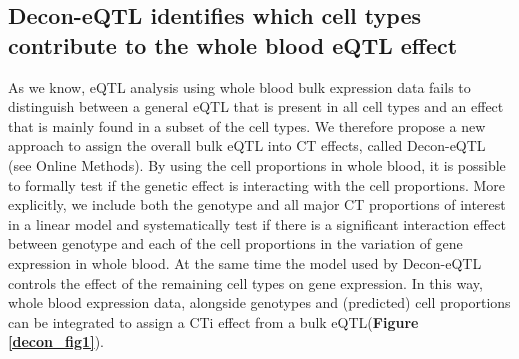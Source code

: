 \subsection{Decon-eQTL identifies which cell types contribute to the whole blood eQTL effect}
As we know, eQTL analysis using whole blood bulk expression data fails to distinguish between a general eQTL that is present in all cell types and an effect that is mainly found in a subset of the cell types. We therefore propose a new approach to assign the overall bulk eQTL into CT effects, called Decon-eQTL (see Online Methods). By using the cell proportions in whole blood, it is possible to formally test if the genetic effect is interacting with the cell proportions. More explicitly, we include both the genotype and all major CT proportions of interest in a linear model and systematically test if there is a significant interaction effect between genotype and each of the cell proportions in the variation of gene expression in whole blood. At the same time the model used by Decon-eQTL controls the effect of the remaining cell types on gene expression. In this way, whole blood expression data, alongside genotypes and (predicted) cell proportions can be integrated to assign a CTi effect from a bulk eQTL(\textbf{Figure \ref{decon_fig1}}).

